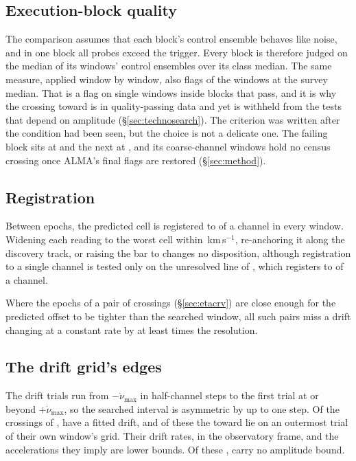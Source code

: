 \subsection{Execution-block quality}
\label{sec:blockquality}

The comparison assumes that each block's control ensemble behaves like
noise, and in one block all \NCtrl{} probes exceed the trigger. Every block
is therefore judged on the median of its windows' control ensembles over its
class median. The same measure, applied window by window, also flags
\DqNWin{} of the \NWindows{} windows at \BqFactor{} the survey median. That is
a flag on single windows inside blocks that pass, and it is why the crossing
toward \BkFlagOtherStar{} is in quality-passing data and yet is withheld from
the tests that depend on amplitude (\S\ref{sec:technosearch}). The criterion was written after the condition
had been seen, but the choice is not a delicate one. The failing block sits
at \BqFailQ{} and the next at \BqNextQ, and its \BqFailNWin{} coarse-channel
windows hold no census crossing once ALMA's final flags are restored
(\S\ref{sec:method}).

\subsection{Registration}
\label{sec:regbudget}

Between epochs, the predicted cell is registered to \RgBudgetChMed{} of a
channel in every window. Widening each reading to the worst cell within
\RgTolKms\,km\,s$^{-1}$, re-anchoring it along the discovery track, or
raising the bar to \ZtTrialThr{} changes no disposition, although
registration to a single channel is tested only on the unresolved line of
\RgRegStar, which registers to \RgRegMaxCh{} of a channel.

\label{sec:pairacct}%
Where the epochs of a pair of crossings (\S\ref{sec:etacrv}) are close
enough for the predicted offset to be tighter than the searched window, all
\TjNPower{} such pairs miss a drift changing at a constant rate by at least
\TjSigMin{} times the resolution.

\subsection{The drift grid's edges}
\label{sec:edge}

The drift trials run from $-\dot\nu_{\max}$ in half-channel steps to the
first trial at or beyond $+\dot\nu_{\max}$, so the searched interval is
asymmetric by up to one step. Of the \EgNPop{} crossings of \EgDriftPop,
\EgNDrift{} have a fitted drift, and of these the \EgNEdge{} toward
\EgEdgeStars{} lie on an outermost trial of their own window's grid. Their
drift rates, in the observatory frame, and the accelerations they imply are
lower bounds. Of these \EgNEdge, \EgNEdgeOut{} carry no amplitude bound.
